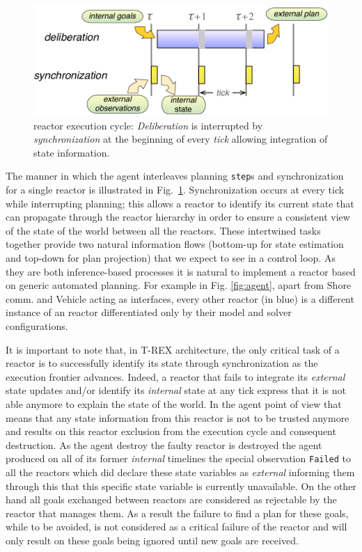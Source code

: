 \begin{figure}[!htbp]
  \centering
  \vskip-1pc
  \includegraphics[width=0.55\columnwidth]{figs/tick-cycle}
  \caption{\small \rx reactor execution cycle: {\em Deliberation} is
    interrupted by {\em synchronization} at the beginning of every
    {\em tick} allowing integration of state information.}
  \label{fig:tick-exec}
  \vskip-0.8pc
\end{figure}

The manner in which the agent interleaves planning \texttt{step}s and
synchronization for a single reactor is illustrated in
Fig.~\ref{fig:tick-exec}. Synchronization occurs at every tick while
interrupting planning; this allows a reactor to identify its current
state that can propagate through the reactor hierarchy in order to
ensure a consistent view of the state of the world between all the
reactors.
These intertwined tasks together provide two natural information flows
(bottom-up for state estimation and top-down for plan projection) that
we expect to see in a control loop. As they are both inference-based
processes it is natural to implement a reactor based on generic
automated planning. For example in Fig. \ref{fig:agent}, apart from
\textsf{Shore comm.} and \textsf{Vehicle} acting as interfaces, every
other reactor (in blue) is a different instance of an \eu reactor
differentiated only by their model and \eu solver configurations.

It is important to note that, in T-REX architecture, the only critical
task of a reactor is to successfully identify its state through
synchronization as the execution frontier advances. Indeed, a reactor
that fails to integrate its {\em external} state updates and/or
identify its {\em internal} state at any tick express that it is not
able anymore to explain the state of the world. In the agent point of
view that means that any state information from this reactor is not to
be trusted anymore and results on this reactor exclusion from the
execution cycle and consequent destruction. As the agent destroy 
the  faulty reactor is destroyed the agent produced on all of 
its former {\em internal} timelines the special observation 
\texttt{Failed} to all the reactors which did declare these state 
variables as {\em external} informing
them through this that this specific state variable is currently
unavailable. On the other hand all goals exchanged between reactors
are considered as rejectable by the reactor that manages them. As a
result the failure to find a plan for these goals, while to be avoided,
is not considered as a critical failure of the reactor and will only
result on these goals being ignored until new goals are received.

